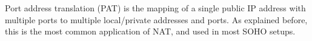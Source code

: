 Port address translation (PAT) is the mapping of a single public IP address with multiple ports to multiple local/private addresses and ports. As explained before, this is the most common application of NAT, and used in most SOHO setups.